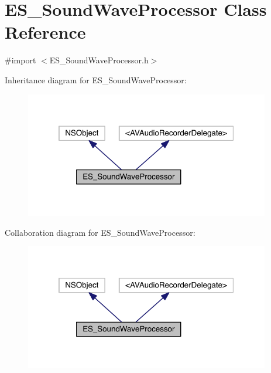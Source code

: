 \hypertarget{interface_e_s___sound_wave_processor}{\section{E\+S\+\_\+\+Sound\+Wave\+Processor Class Reference}
\label{interface_e_s___sound_wave_processor}
}


{\ttfamily \#import $<$E\+S\+\_\+\+Sound\+Wave\+Processor.\+h$>$}



Inheritance diagram for E\+S\+\_\+\+Sound\+Wave\+Processor\+:\nopagebreak
\begin{figure}[H]
\begin{center}
\leavevmode
\includegraphics[width=303pt]{d9/d92/interface_e_s___sound_wave_processor__inherit__graph}
\end{center}
\end{figure}


Collaboration diagram for E\+S\+\_\+\+Sound\+Wave\+Processor\+:\nopagebreak
\begin{figure}[H]
\begin{center}
\leavevmode
\includegraphics[width=303pt]{d6/d2e/interface_e_s___sound_wave_processor__coll__graph}
\end{center}
\end{figure}
